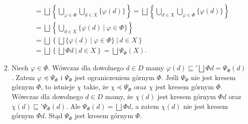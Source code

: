 \begin{dowod}
\begin{enumerate}
\begin{align*}
                        &= \bigsqcup \left\{\bigcup\limits_{\varphi\in\Phi}\bigcup\limits_{d\in X}\{\varphi(d)\}\right\}
                         =\bigsqcup \left\{\bigcup\limits_{d\in X}\bigcup\limits_{\varphi\in\Phi}\{\varphi(d)\}\right\}\\
                        &= \bigsqcup \left\{\bigcup\limits_{d\in X}\{\varphi(d)\ |\ \varphi\in\Phi \}\right\}\\
                        &= \bigsqcup \left\{\bigsqcup \{\varphi(d)\ |\ \varphi\in\Phi \}\ |\ d\in X\right\}\\
                        &= \bigsqcup \left\{\bigsqcup \Phi d\ |\ d\in X\right\}
                        = \bigsqcup \Psi_\Phi(X).
          \end{align*}
        \item Niech \(\varphi\in\Phi\). Wówczas dla dowolnego \(d\in D\) mamy \(\varphi(d)\sqsubseteq' \bigsqcup \Phi d = \Psi_{\Phi}(d)\). Zatem \(\varphi\preceq\Psi_\Phi\) i \(\Psi_\Phi\) jest ograniczeniem górnym \(\Phi\). Jeśli \(\Psi_\Phi\) nie jest kresem górnym \(\Phi\), to istnieje \(\chi\) takie, że \(\chi\preceq\Psi_\Phi\) oraz \(\chi\) jest kresem górnym \(\Phi\). Wówczas dla dowolnego \(d\in D\) mamy, że \(\chi(d)\) jest kresem górnym \(\Phi d\) oraz \(\chi(d)\sqsubseteq'\Psi_\Phi(d)\). Ale \(\Psi_\Phi(d)=\bigsqcup\Phi d\), a zatem \(\chi(d)\) nie jest kresem górnym \(\Phi d\). Stąd \(\Psi_\Phi\) jest kresem górnym \(\Phi\).   

      \end{enumerate}
\end{dowod}
